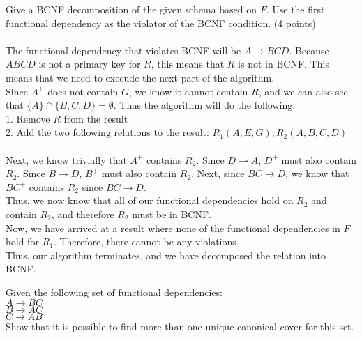 \documentclass[a4 paper]{article}
\begin{document}
 Give a BCNF decomposition of the given schema based on $F$. Use the first functional dependency as the violator of the BCNF condition. \indent (4 points)\\\\
The functional dependency that violates BCNF will be $A\rightarrow BCD$. Because $ABCD$ is not a primary key for $R $, this means that $R$ is not in BCNF. This means that we need to execude the next part of the algorithm.\\
Since $A^+$ does not contain $G$, we know it cannot contain $R$, and we can also see that $\{A\}\cap\{B,C,D\}=\emptyset$. Thus the algorithm will do the following:\\
1. Remove $R$ from the result\\
2. Add the two following relations to the result: $R_1(A,E,G), R_2(A,B,C,D)$\\\\
Next, we know trivially that $A^+$ contains $R_2$. Since $D\rightarrow A$, $D^+$ must also contain $R_2$. Since $B\rightarrow D$, $B^+$ must also contain $R_2$. Next, since $BC\rightarrow D$, we know that $BC^+$ contains $R_2$ since $BC\rightarrow D$.\\
Thus, we now know that all of our functional dependencies hold on $R_2$ and contain $R_2$, and therefore $R_2$ must be in BCNF.\\
Now, we have arrived at a result where none of the functional dependencies in $F$ hold for $R_1$. Therefore, there cannot be any violations.\\
Thus, our algorithm terminates, and we have decomposed the relation into BCNF.




Given the following set of functional dependencies:\\
$A \rightarrow BC$\\
$B \rightarrow AC$\\
$C \rightarrow AB$\\
Show that it is possible to find more than one unique canonical cover for this set.\\\\
\end{document}
